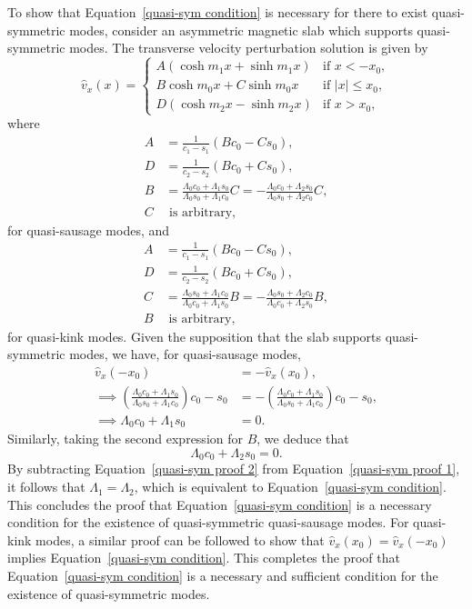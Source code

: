To show that Equation~\eqref{quasi-sym condition} is necessary for there to exist quasi-symmetric modes, consider an asymmetric magnetic slab which supports quasi-symmetric modes. The transverse velocity perturbation solution is given by
\begin{equation}
\widehat{v}_x(x) =
\begin{cases}
A(\cosh{m_1x} + \sinh{m_1x}) & \text{if } x < -x_0, \\
B\cosh{m_0x} + C\sinh{m_0x} & \text{if } |x| \leq x_0, \\
D(\cosh{m_2x} - \sinh{m_2x}) & \text{if } x > x_0,
\end{cases}
\end{equation}
where
\begin{align}
A &= \frac{1}{c_1 - s_1}(Bc_0 - Cs_0), \\ 
D &= \frac{1}{c_2 - s_2}(Bc_0 + Cs_0), \\
B &= \frac{\Lambda_0c_0 + \Lambda_1s_0}{\Lambda_0s_0 + \Lambda_1c_0}C = -\frac{\Lambda_0c_0 + \Lambda_2s_0}{\Lambda_0s_0 + \Lambda_2c_0}C, \\
C & \text{ is arbitrary},
\end{align}
for quasi-sausage modes, and
\begin{align}
A &= \frac{1}{c_1 - s_1}(Bc_0 - Cs_0), \\ 
D &= \frac{1}{c_2 - s_2}(Bc_0 + Cs_0), \\
C &= \frac{\Lambda_0s_0 + \Lambda_1c_0}{\Lambda_0c_0 + \Lambda_1s_0}B = -\frac{\Lambda_0s_0 + \Lambda_2c_0}{\Lambda_0c_0 + \Lambda_2s_0}B, \\
B & \text{ is arbitrary},
\end{align}
for quasi-kink modes. Given the supposition that the slab supports quasi-symmetric modes, we have, for quasi-sausage modes,
\begin{align}
\widehat{v}_x(-x_0) &= -\widehat{v}_x(x_0), \\
\implies \left(\frac{\Lambda_0c_0 + \Lambda_1s_0}{\Lambda_0s_0 + \Lambda_1c_0}\right) c_0 - s_0 &= -\left(\frac{\Lambda_0c_0 + \Lambda_1s_0}{\Lambda_0s_0 + \Lambda_1c_0}\right)c_0 - s_0, \\
\implies \Lambda_0c_0 + \Lambda_1s_0 &= 0. \label{quasi-sym proof 1}
\end{align}
Similarly, taking the second expression for $B$, we deduce that 
\begin{equation}
\Lambda_0c_0 + \Lambda_2s_0 = 0. \label{quasi-sym proof 2}
\end{equation}
By subtracting Equation~\eqref{quasi-sym proof 2} from Equation~\eqref{quasi-sym proof 1}, it follows that $\Lambda_1 = \Lambda_2$, which is equivalent to Equation~\eqref{quasi-sym condition}. This concludes the proof that Equation~\eqref{quasi-sym condition} is a necessary condition for the existence of quasi-symmetric quasi-sausage modes. For quasi-kink modes, a similar proof can be followed to show that $\widehat{v}_x(x_0) = \widehat{v}_x(-x_0)$ implies Equation~\eqref{quasi-sym condition}. This completes the proof that Equation~\eqref{quasi-sym condition} is a necessary and sufficient condition for the existence of quasi-symmetric modes.

